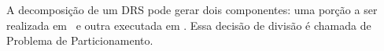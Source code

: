     
    A decomposição de um DRS pode gerar dois componentes: uma porção a ser realizada em \hardware\ e outra executada em \software.
    Essa decisão de divisão é chamada de Problema de Particionamento.
    
